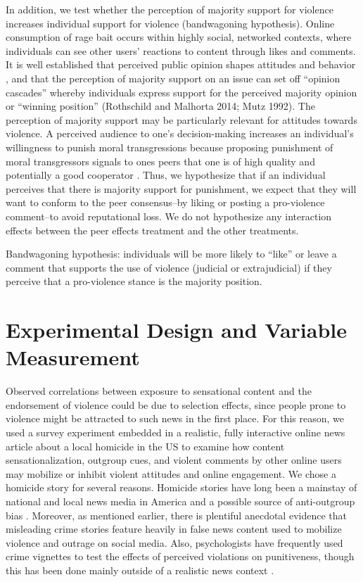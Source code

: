 \documentclass[12pt, letterpaper]{article}
\begin{document}
In addition, we test whether the perception of majority support for violence increases individual support for violence (bandwagoning hypothesis). Online consumption of rage bait occurs within highly social, networked contexts, where individuals can see other users' reactions to content through likes and comments. It is well established that perceived public opinion shapes attitudes and behavior \citep{neubaum2017monitoring,noelleneumann1993spiral}, and that the perception of majority support on an issue can set off ``opinion cascades'' whereby individuals express support for the perceived majority opinion or ``winning position'' (Rothschild and Malhorta 2014; Mutz 1992). The perception of majority support may be particularly relevant for attitudes towards violence. A perceived audience to one's decision-making increases an individual's willingness to punish moral transgressions \citep{kurzban2007audience} because proposing punishment of moral transgressors signals to ones peers that one is of high quality and potentially a good cooperator \citep{fessler2003strategy,gintis2001costly}. Thus, we hypothesize that if an individual perceives that there is majority support for punishment, we expect that they will want to conform to the peer consensus--by liking or posting a pro-violence comment--to avoid reputational loss. We do not hypothesize any interaction effects between the peer effects treatment and the other treatments.

Bandwagoning hypothesis: individuals will be more likely to ``like'' or leave a comment that supports the use of violence (judicial or extrajudicial) if they perceive that a pro-violence stance is the majority position.

\section{Experimental Design and Variable Measurement}

Observed correlations between exposure to sensational content and the endorsement of violence could be due to selection effects, since people prone to violence might be attracted to such news in the first place. For this reason, we used a survey experiment embedded in a realistic, fully interactive online news article about a local homicide in the US to examine how content sensationalization, outgroup cues, and violent comments by other online users may mobilize or inhibit violent attitudes and online engagement. We chose a homicide story for several reasons. Homicide stories have long been a mainstay of national and local news media in America and a possible source of anti-outgroup bias \citep{gilliam2000prime}. Moreover, as mentioned earlier, there is plentiful anecdotal evidence that misleading crime stories feature heavily in false news content used to mobilize violence and outrage on social media. Also, psychologists have frequently used crime vignettes to test the effects of perceived violations on punitiveness, though this has been done mainly outside of a realistic news context \citep{fincher2016perceptual, tetlock2007}. 
\end{document}
